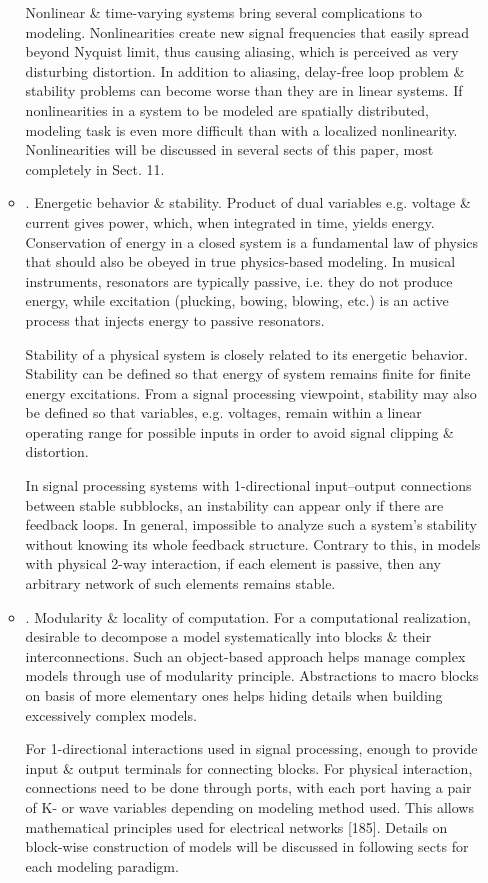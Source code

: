 \documentclass{article}
\begin{document}
\begin{itemize}
\begin{itemize}
		Nonlinear \& time-varying systems bring several complications to modeling. Nonlinearities create new signal frequencies that easily spread beyond Nyquist limit, thus causing aliasing, which is perceived as very disturbing distortion. In addition to aliasing, delay-free loop problem \& stability problems can become worse than they are in linear systems. If nonlinearities in a system to be modeled are spatially distributed, modeling task is even more difficult than with a localized nonlinearity. Nonlinearities will be discussed in several sects of this paper, most completely in Sect. 11.
		\item {. Energetic behavior \& stability.} Product of dual variables e.g. voltage \& current gives power, which, when integrated in time, yields energy. Conservation of energy in a closed system is a fundamental law of physics that should also be obeyed in true physics-based  modeling. In musical instruments, resonators are typically passive, i.e. they do not produce energy, while excitation (plucking, bowing, blowing, etc.) is an active process that injects energy to passive resonators.
		
		Stability of a physical system is closely related to its energetic behavior. Stability can be defined so that energy of system remains finite for finite energy excitations. From a signal processing viewpoint, stability may also be defined so that variables, e.g. voltages, remain within a linear operating range for possible inputs in order to avoid signal clipping \& distortion.
		
		In signal processing systems with 1-directional input--output connections between stable subblocks, an instability can appear only if there are feedback loops. In general, impossible to analyze such a system's stability without knowing its whole feedback structure. Contrary to this, in models with physical 2-way interaction, if each element is passive, then any arbitrary network of such elements remains stable.
		\item {. Modularity \& locality of computation.} For a computational realization, desirable to decompose a model systematically into blocks \& their interconnections. Such an object-based approach helps manage complex models through use of modularity principle. Abstractions to macro blocks on basis of more elementary ones helps hiding details when building excessively complex models.
		
		For 1-directional interactions used in signal processing, enough to provide input \& output terminals for connecting blocks. For physical interaction, connections need to be done through ports, with each port having a pair of K- or wave variables depending on modeling method used. This allows mathematical principles used for electrical networks [185]. Details on block-wise construction of models will be discussed in following sects for each modeling paradigm.
		

\end{itemize}
\end{itemize}
\end{document}

